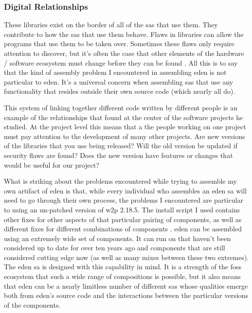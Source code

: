 \documentclass[a4paper,man,natbib,floatsintext]{apa6}
\begin{document}
   \subsubsection{Digital Relationships}
   These libraries exist on the border of all of the \glspl{sa} that use them. They contribute to how the \glspl{sa} that use them behave. Flaws in libraries can allow the programs that use them to be taken over. Sometimes these flaws only require attention to discover, but it's often the case that other elements of the hardware / software ecosystem must change before they can be found \citep{Huang2003-ki}. All this is to say that the kind of assembly problem I encountered in assembling \acrshort{eden} is not particular to \acrshort{eden}. It's a universal concern when assembling \glspl{sa} that use any functionality that resides outside their own source code (which nearly all do).

   This system of linking together different code written by different people is an example of the relationships that \citet{Mackenzie2006-hb} found at the center of the software projects he studied. At the project level this means that a the people working on one project must pay attention to the development of many other projects. Are new versions of the libraries that you use being released? Will the old version be updated if security flaws are found? Does the new version have features or changes that would be useful for our project? 

   What is striking about the problems encountered while trying to assemble my own artifact of \acrshort{eden} is that, while every individual who assembles an \acrshort{eden} \gls{sa} will need to go through their own process, the problems I encountered are particular to using an un-patched version of \gls{w2p} 2.18.5. The install script I used contains other fixes for other aspects of that particular pairing of components, as well as different fixes for different combinations of components \citep{Sahana_Foundation2018-eq}. \acrshort{eden} can be assembled using an extremely wide set of components. It can run on that haven't been considered up to date for over ten years ago and components that are still considered cutting edge now (as well as many mixes between these two extremes). The \acrshort{eden} \gls{sa} is designed with this capability in mind. It is a strength of the \acrshort{foss} ecosystem that such a wide range of compositions is possible, but it also means that \acrshort{eden} can be a nearly limitless number of different \glspl{sa} whose qualities emerge both from \acrshort{eden}'s source code and the interactions between the particular versions of the components.
\end{document}
